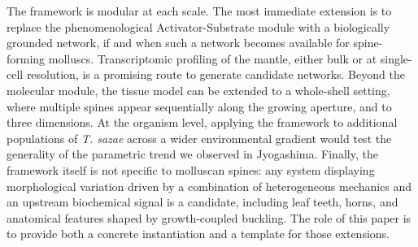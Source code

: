 \documentclass[11pt]{article}
\begin{document}
The framework is modular at each scale. The most immediate extension is
to replace the phenomenological Activator-Substrate module with a
biologically grounded network, if and when such a network becomes
available for spine-forming molluscs. Transcriptomic profiling of the
mantle, either bulk or at single-cell resolution, is a promising route
to generate candidate networks. Beyond the molecular module, the tissue
model can be extended to a whole-shell setting, where multiple spines
appear sequentially along the growing aperture, and to three dimensions.
At the organism level, applying the framework to additional populations
of \textit{T. sazae} across a wider environmental gradient would test the
generality of the parametric trend we observed in Jyogashima. Finally,
the framework itself is not specific to molluscan spines: any system
displaying morphological variation driven by a combination of
heterogeneous mechanics and an upstream biochemical signal is a
candidate, including leaf teeth, horns, and anatomical features shaped by
growth-coupled buckling. The role of this paper is to provide both a
concrete instantiation and a template for those extensions.


\end{document}
